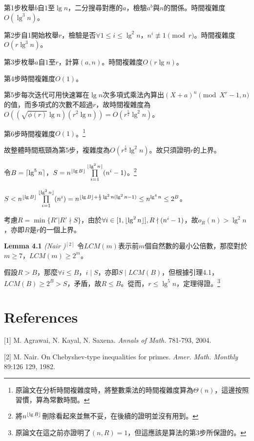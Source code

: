 \documentclass{article}
\DeclarePairedDelimiter\ceil{\lceil}{\rceil}
\DeclarePairedDelimiter\floor{\lfloor}{\rfloor}
\newcommand{\nequiv}{\not\equiv}
\begin{document}
    第1步枚舉$b$自$1$至$\lg n$，二分搜尋對應的$a$，檢驗$a^b$與$n$的關係。時間複雜度$O(\lg^3n)$。

    第2步自1開始枚舉$r$，檢驗是否$\forall 1\leq i\leq\lg^2n$，$n^i\nequiv 1\pmod{r}$。時間複雜度$O(r\lg^3n)$。

    第3步枚舉$a$自$1$至$r$，計算$(a,n)$。時間複雜度$O(r\lg n)$。

    第4步時間複雜度$O(1)$。

    第5步每次迭代可用快速冪在$\lg n$次多項式乘法內算出$(X+a)^n\pmod{X^r-1, n}$的值，而多項式的次數不超過$r$，故時間複雜度為$O((\sqrt{\phi(r)}\lg n)(r^2\lg n))=O(r^{\frac{5}{2}}\lg^2n)$。

    第6步時間複雜度$O(1)$。\footnote{原論文在分析時間複雜度時，將整數乘法的時間複雜度算為$\Theta(n)$，這邊按照習慣，算為常數時間。}

    故整體時間瓶頸為第5步，複雜度為$O(r^{\frac{5}{2}}\lg^2n)$。故只須證明$r$的上界。

    令$B=\ceil{\lg^5n}$，$S=n^{\floor{\lg B}}\prod\limits_{i=1}^{\floor{\lg^2n}}(n^i-1)$。\footnote{將$n^{\floor{\lg B}}$刪除看起來並無不妥，在後續的證明並沒有用到。}

    $S<n^{\floor{\lg B}}\prod\limits_{i=1}^{\floor{\lg^2n}}(n^i)=n^{\floor{\lg B}+\frac{1}{2}\lg^2n(\lg^2n-1)}\leq n^{\lg^4n}\leq 2^B$。

    考慮$R=\min\{R'|R'\nmid S\}$，由於$\forall i\in[1, \floor{\lg^2n}], R\nmid(n^i-1)$，故$o_R(n)>\lg^2n$，亦即$R$是$r$的一個上界。

\begin{mdframed}
\noindent\textbf{Lemma 4.1} \textit{(Nair )}$^{[2]}$ 令$LCM(m)$表示前$m$個自然數的最小公倍數，那麼對於$m\geq 7$，$LCM(m)\geq 2^m$。
\end{mdframed}

    假設$R>B$，那麼$\forall i\leq B$，$i\mid S$，亦即$S\mid LCM(B)$，但根據引理4.1，$LCM(B)\geq 2^B>S$，矛盾，故$R\leq B$。從而，$r\leq \lg^5n$，定理得證。\footnote{原論文在這之前亦證明了$(n,R)=1$，但這應該是算法的第3步所保證的。}



\section{References}

    [1] M. Agrawai, N. Kayal, N. Saxena. \textit{Annals of Math.} 781-793, 2004.

    [2] M. Nair. On Chebyshev-type inequalities for primes. \textit{Amer. Math. Monthly} 89:126 129, 1982.
    
\end{document}

